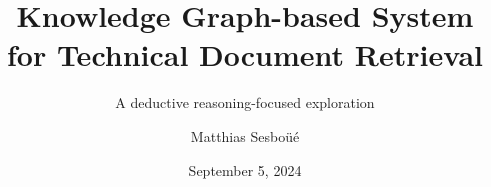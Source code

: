 

\title{Knowledge Graph-based System for Technical Document Retrieval}
\subtitle{A deductive reasoning-focused exploration}
\author{Matthias Sesboüé}
\date{September 5, 2024}


    \frame{\titlepage}
    
    
    

    
    

    

    
    
    

    

